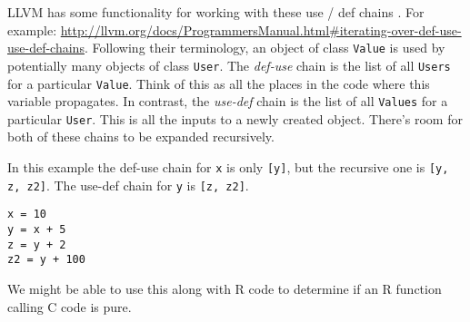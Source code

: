 \documentclass[12pt]{article}
\begin{document}
LLVM has some functionality for working with these use / def chains
\cite{Lattner2004}. For example:
\url{http://llvm.org/docs/ProgrammersManual.html#iterating-over-def-use-use-def-chains}.
Following their terminology, an object of class \texttt{Value} is used by
potentially many objects of class \texttt{User}. The \emph{def-use} chain
is the list of all \texttt{Users} for a particular \texttt{Value}. Think
of this as all the places in the code where this variable propagates. In
contrast, the \emph{use-def} chain is the list of all \texttt{Values} for a
particular \texttt{User}. This is all the inputs to a newly
created object. There's room for both of these chains to be expanded recursively.

In this example the def-use chain for \texttt{x} is only \texttt{[y]}, but the
recursive one is \texttt{[y, z, z2]}. The use-def chain for \texttt{y} is
\texttt{[z, z2]}.

\begin{verbatim}
x = 10
y = x + 5
z = y + 2
z2 = y + 100
\end{verbatim}

We might be able to use this along with R code to determine if an R
function calling C code is pure.





 
\end{document}
